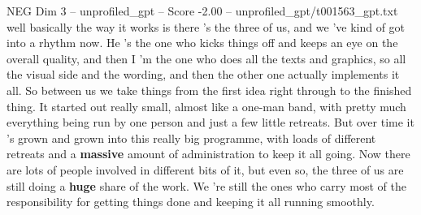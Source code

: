 \begin{textsample}{NEG Dim 3 – unprofiled\_gpt – Score -2.00 – unprofiled\_gpt/t001563\_gpt.txt}  \label{ex:f3_neg_002}
well basically the way it works is there ’s the three of us, and we ’ve kind of got into a rhythm now.
He ’s the one who kicks things off and keeps an eye on the overall quality, and then I ’m the one who does all the texts and graphics, so all the visual side and the wording, and then the other one actually implements it all.
So between us we take things from the first idea right through to the finished thing.
It started out really small, almost like a one-man band, with pretty much everything being run by one person and just a few little retreats.
But over time it ’s grown and grown into this really big programme, with loads of different retreats and a \textbf{massive} amount of administration to keep it all going.
Now there are lots of people involved in different bits of it, but even so, the three of us are still doing a \textbf{huge} share of the work.
We ’re still the ones who carry most of the responsibility for getting things done and keeping it all running smoothly.

\end{textsample}
